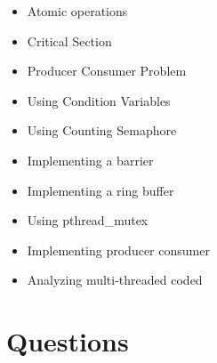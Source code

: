 \begin{itemize}
\tightlist
\item
  Atomic operations
\item
  Critical Section
\item
  Producer Consumer Problem
\item
  Using Condition Variables
\item
  Using Counting Semaphore
\item
  Implementing a barrier
\item
  Implementing a ring buffer
\item
  Using pthread\_mutex
\item
  Implementing producer consumer
\item
  Analyzing multi-threaded coded
\end{itemize}

\section{Questions}

